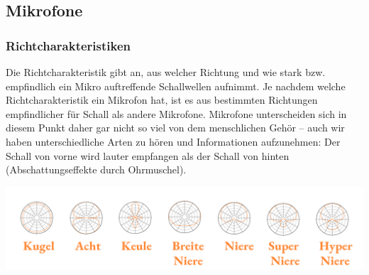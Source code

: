 \subsection{Mikrofone}
    \subsubsection{Richtcharakteristiken}
Die Richtcharakteristik gibt an, aus welcher Richtung und wie stark bzw. empfindlich ein Mikro auftreffende Schallwellen aufnimmt. Je nachdem welche Richtcharakteristik ein Mikrofon hat, ist es aus bestimmten Richtungen empfindlicher für Schall als andere Mikrofone. Mikrofone unterscheiden sich in diesem Punkt daher gar nicht so viel von dem menschlichen Gehör – auch wir haben unterschiedliche Arten zu hören und Informationen aufzunehmen: Der Schall von vorne wird lauter empfangen als der Schall von hinten (Abschattungseffekte durch Ohrmuschel).\cite{BeyerRichtchar}
\begin{center}
    \includegraphics[width=1\textwidth]{Bilder/Medientechnik/Mikrocharakteristik.png}
\end{center}

